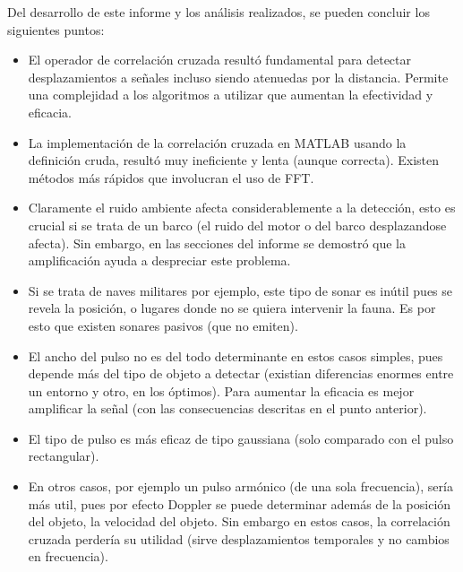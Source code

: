 \documentclass[letterpaper,11pt]{article}
\begin{document}
Del desarrollo de este informe y los análisis realizados, se pueden concluir los siguientes puntos:

\begin{itemize}

\item  El operador de correlación cruzada resultó fundamental para detectar desplazamientos a señales incluso siendo atenuedas por la distancia. Permite una complejidad a los algoritmos a utilizar que aumentan la efectividad y eficacia.

\item La implementación de la correlación cruzada en MATLAB usando la definición cruda, resultó muy ineficiente y lenta (aunque correcta). Existen métodos más rápidos que involucran el uso de FFT.

\item Claramente el ruido ambiente afecta considerablemente a la detección, esto es crucial si se trata de un barco (el ruido del motor o del barco desplazandose afecta). Sin embargo, en las secciones del informe se demostró que la amplificación ayuda a despreciar este problema.

\item Si se trata de naves militares por ejemplo, este tipo de sonar es inútil pues se revela la posición, o lugares donde no se quiera intervenir la fauna. Es por esto que existen sonares pasivos (que no emiten).

\item El ancho del pulso no es del todo determinante en estos casos simples, pues depende más del tipo de objeto a detectar (existian diferencias enormes entre un entorno y otro, en los óptimos). Para aumentar la eficacia es mejor amplificar la señal (con las consecuencias descritas en el punto anterior).

\item El tipo de pulso es más eficaz de tipo gaussiana (solo comparado con el pulso rectangular).

\item En otros casos, por ejemplo un pulso armónico (de una sola frecuencia), sería más util, pues por efecto Doppler se puede determinar además de la posición del objeto, la velocidad del objeto. Sin embargo en estos casos, la correlación cruzada perdería su utilidad (sirve desplazamientos temporales y no cambios en frecuencia).

\end{itemize}
\end{document}
